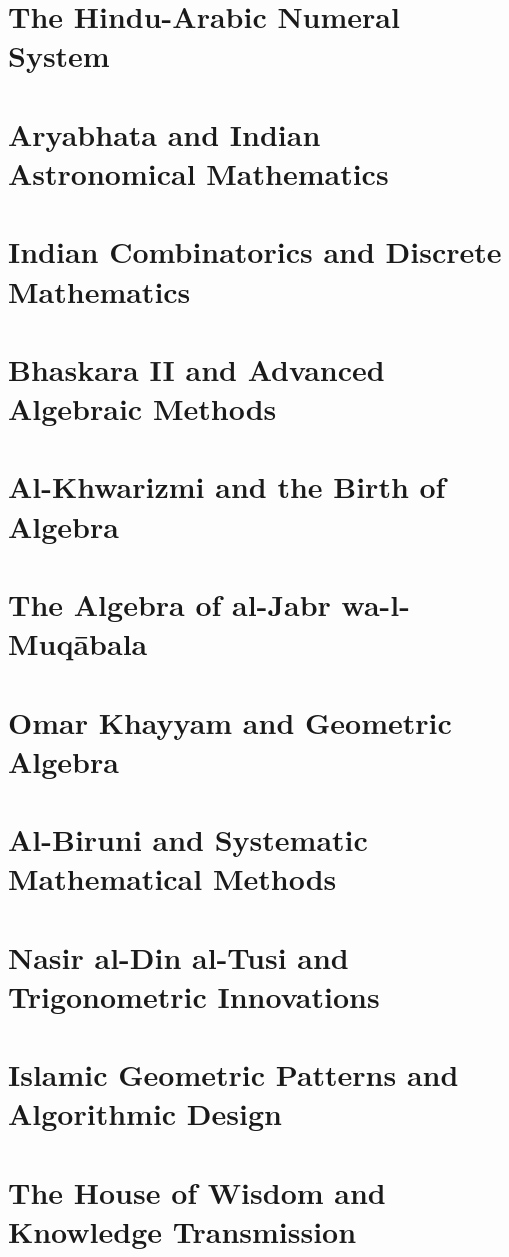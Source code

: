 \chapter{The Hindu-Arabic Numeral System  }
\chapter{Aryabhata and Indian Astronomical Mathematics  }
\chapter{Indian Combinatorics and Discrete Mathematics  }
\chapter{Bhaskara II and Advanced Algebraic Methods  }
\chapter{Al-Khwarizmi and the Birth of Algebra  }
\chapter{The Algebra of al-Jabr wa-l-Muqābala  }
\chapter{Omar Khayyam and Geometric Algebra  }
\chapter{Al-Biruni and Systematic Mathematical Methods  }
\chapter{Nasir al-Din al-Tusi and Trigonometric Innovations  }
\chapter{Islamic Geometric Patterns and Algorithmic Design  }
\chapter{The House of Wisdom and Knowledge Transmission}